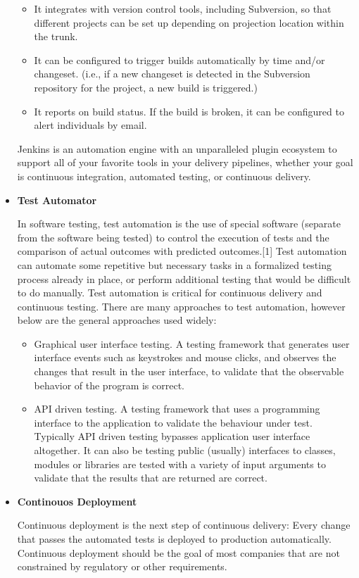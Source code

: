 \documentclass[12pt,a4paper,oneside]{report}
\begin{document}
\begin{itemize}
\begin{itemize}
\item It integrates with version control tools, including Subversion, so that different projects can be set up depending on projection location within the trunk.
\item It can be configured to trigger builds automatically by time and/or changeset. (i.e., if a new changeset is detected in the Subversion repository for the project, a new build is triggered.)
\item It reports on build status. If the build is broken, it can be configured to alert individuals by email.
\end{itemize}


Jenkins is an automation engine with an unparalleled plugin ecosystem to support all of your favorite tools in your delivery pipelines, whether your goal is continuous integration, automated testing, or continuous delivery. 
 \item  \textbf{Test Automator}
\par In software testing, test automation is the use of special software (separate from the software being tested) to control the execution of tests and the comparison of actual outcomes with predicted outcomes.[1] Test automation can automate some repetitive but necessary tasks in a formalized testing process already in place, or perform additional testing that would be difficult to do manually. Test automation is critical for continuous delivery and continuous testing. There are many approaches to test automation, however below are the general approaches used widely:

\begin{itemize}
\item Graphical user interface testing. A testing framework that generates user interface events such as keystrokes and mouse clicks, and observes the changes that result in the user interface, to validate that the observable behavior of the program is correct.
\item API driven testing. A testing framework that uses a programming interface to the application to validate the behaviour under test. Typically API driven testing bypasses application user interface altogether. It can also be testing public (usually) interfaces to classes, modules or libraries are tested with a variety of input arguments to validate that the results that are returned are correct.
\end{itemize}


\item \textbf{Continouos Deployment}
\par Continuous deployment is the next step of continuous delivery: Every change that passes the automated tests is deployed to production automatically. Continuous deployment should be the goal of most companies that are not constrained by regulatory or other requirements.

\end{itemize}
\end{document}
